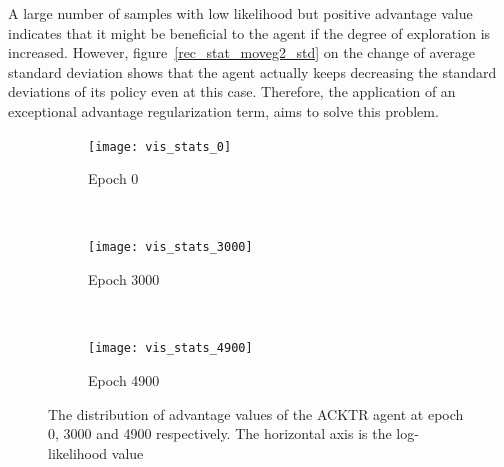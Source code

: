 A large number of samples with low likelihood but positive advantage value indicates that it might be beneficial to the agent if the degree of exploration is increased. However, figure~\ref{rec_stat_moveg2_std} on the change of average standard deviation shows that the agent actually keeps decreasing the standard deviations of its policy even at this case. Therefore, the application of an exceptional advantage regularization term, aims to solve this problem.
\begin{figure}[!htbp]
	\centering
	\begin{subfigure}[t]{0.5\textwidth}
		\centering
		\texttt{[image: vis\_stats\_0]}
		\caption{Epoch 0}
			\label{vis_stats_0}
	\end{subfigure}%
	~ 
	\begin{subfigure}[t]{0.5\textwidth}
		\centering
		\texttt{[image: vis\_stats\_3000]}
		\caption{Epoch 3000}
			\label{vis_stats_3000}
	\end{subfigure}
	~ 
	\begin{subfigure}[t]{0.7\textwidth}
		\centering
		\texttt{[image: vis\_stats\_4900]}
		\caption{Epoch 4900}
		\label{vis_stats_4900}
	\end{subfigure}
	\caption{The distribution of advantage values of the ACKTR agent at epoch 0, 3000 and 4900 respectively. The horizontal axis is the log-likelihood value}
\end{figure}
%
%

